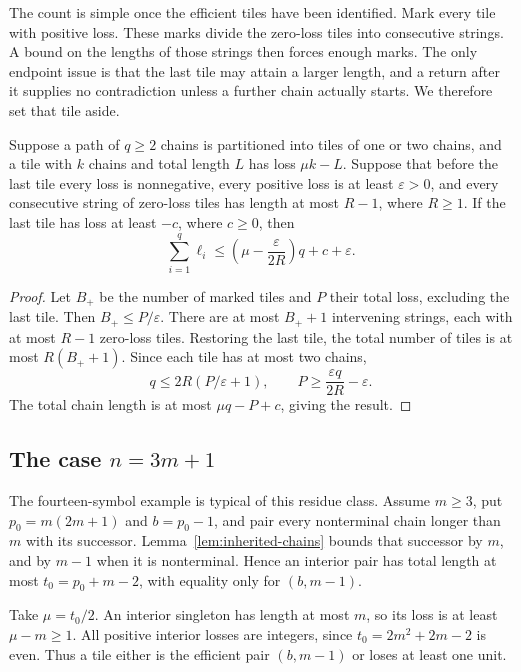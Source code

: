 The count is simple once the efficient tiles have been identified.
Mark every tile with positive loss. These marks divide the zero-loss
tiles into consecutive strings. A bound on the lengths of those strings
then forces enough marks. The only endpoint issue is that the last tile
may attain a larger length, and a return after it supplies no contradiction
unless a further chain actually starts. We therefore set that tile aside.

\begin{lemma}\label{lem:tiles}
Suppose a path of $q\ge2$ chains is partitioned into tiles of one or
two chains, and a tile with $k$ chains and total length $L$ has loss
$\mu k-L$. Suppose that before the last tile every loss is nonnegative,
every positive loss is at least $\varepsilon>0$, and every consecutive
string of zero-loss tiles has length at most $R-1$, where $R\ge1$.
If the last tile has loss at least $-c$, where $c\ge0$, then
\[
 \sum_{i=1}^q\ell_i\le
 \left(\mu-\frac{\varepsilon}{2R}\right)q+c+\varepsilon.
\]
\end{lemma}

\begin{proof}
Let $B_+$ be the number of marked tiles and $P$ their total loss,
excluding the last tile. Then $B_+\le P/\varepsilon$. There are at
most $B_++1$ intervening strings, each with at most $R-1$ zero-loss
tiles. Restoring the last tile, the total number of tiles is at most
$R(B_++1)$. Since each tile has at most two chains,
\[
 q\le2R(P/\varepsilon+1),\qquad
 P\ge\frac{\varepsilon q}{2R}-\varepsilon.
\]
The total chain length is at most $\mu q-P+c$, giving the result.
\end{proof}

\subsection{The case \texorpdfstring{$n=3m+1$}{n=3m+1}}

The fourteen-symbol example is typical of this residue class. Assume
$m\ge3$, put $p_0=m(2m+1)$ and $b=p_0-1$, and pair every nonterminal
chain longer than $m$ with its successor. Lemma~\ref{lem:inherited-chains} bounds that successor by $m$, and
by $m-1$ when it is nonterminal. Hence an interior pair has total
length at most $t_0=p_0+m-2$, with equality only for $(b,m-1)$.

Take $\mu=t_0/2$. An interior singleton has length at most $m$, so
its loss is at least $\mu-m\ge1$. All positive interior losses are
integers, since $t_0=2m^2+2m-2$ is even. Thus a tile either is the
efficient pair $(b,m-1)$ or loses at least one unit.

